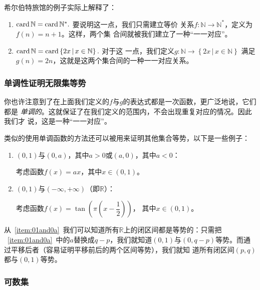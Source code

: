 希尔伯特旅馆的例子实际上解释了：
\begin{enumerate}
    \item $\operatorname{card}\mathbb{N}=\operatorname{card}\mathbb{N}^\ast.$ 要说明这一点，我们只需建立等价
        关系$f: \mathbb{N} \to \mathbb{N}^\ast$，定义为$f(n)=n+1$。这样，两个集
        合间就被我们建立了一种“一一对应”。

    \item $\operatorname{card}\mathbb{N}=\operatorname{card}\left\{ 2x\,|\,x\in\mathbb{N} \right\}.$ 对于这
        一点，我们定义$g: \mathbb{N} \to \left\{ 2x\,|\,x\in\mathbb{N} \right\}$
        满足$g(n)=2n$，这就是这两个集合间的一种一一对应关系。
\end{enumerate}

\subsubsection{单调性证明无限集等势}

你也许注意到了在上面我们定义的$f$与$g$的表达式都是一次函数，更广泛地说，它们都是
\emph{单调的}。这就保证了在我们定义的范围内，不会出现重复对应的情况。因此我们才
说，这是一种“一一对应”。

类似的使用单调函数的方法还可以被用来证明其他集合等势，以下是一些例子：

\begin{enumerate}
    \item $\left( 0,1 \right) $与$\left( 0,a \right) $，其中$a > 0$或$\left( a,0 
        \right) $，其中$a < 0$：\label{item:01and0a}

        考虑函数$f(x)=ax$，其中$x\in \left( 0,1 \right)$。

    \item $\left( 0,1 \right) $与$\left( -\infty,+\infty \right) $（即$\mathbb{R}
        $）：

        考虑函数$f(x)=\tan \left( \pi \left( x - \dfrac{1}{2} \right)  \right) $，
        其中$x\in \left( 0,1 \right) $。
\end{enumerate}

从~\ref{item:01and0a}~我们可以知道所有$\mathbb{R}$上的闭区间都是等势的：只需把%
~\ref{item:01and0a}~中的$a$替换成$q-p$，我们就知道$\left( 0,1 \right) $与$\left( 
0,q-p \right) $等势。而通过平移后者（容易证明平移前后的两个区间等势），我们就知
道所有闭区间$\left( p,q\right) $都与$\left( 0,1 \right) $等势。

\subsubsection{可数集}

